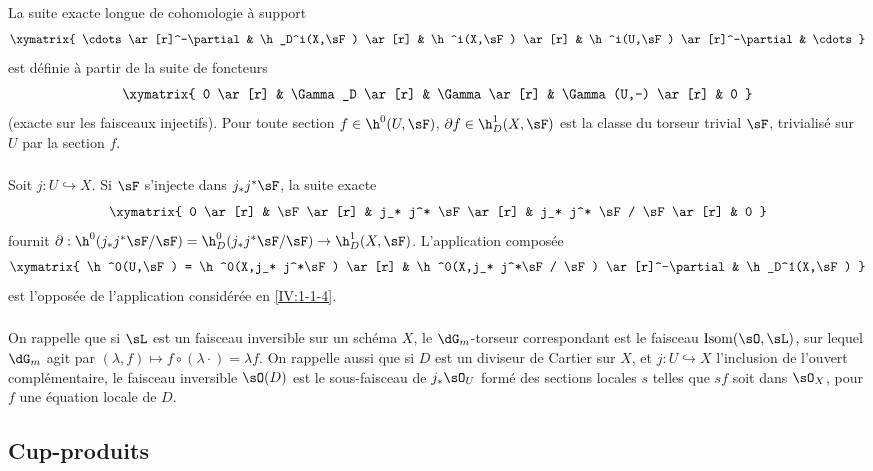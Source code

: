 La suite exacte longue de cohomologie à support
\[\xymatrix{
  \cdots \ar[r]^-\partial 
    & \h_D^i(X,\sF) \ar[r] 
    & \h^i(X,\sF) \ar[r]
    & \h^i(U,\sF) \ar[r]^-\partial 
    & \cdots
}\]
est définie à partir de la suite de foncteurs 
\[\xymatrix{
  0 \ar[r] 
    & \Gamma_D \ar[r] 
    & \Gamma \ar[r] 
    & \Gamma(U,-) \ar[r] 
    & 0
}\]
(exacte sur les faisceaux injectifs). Pour toute section $f\in \h^0(U,\sF)$, 
$\partial f\in \h_D^1(X,\sF)$ est la classe du torseur trivial $\sF$, 
trivialisé sur $U$ par la section $f$. 





\subsubsection{}\label{IV:1-1-5}

\marginpar{!}Soit $j:U\hookrightarrow X$. Si $\sF$ s'injecte dans $j_* j^* \sF$, la suite 
exacte 
\[\xymatrix{
  0 \ar[r] 
  & \sF \ar[r]
  & j_* j^* \sF \ar[r]
  & j_* j^* \sF / \sF \ar[r]
  & 0
}\]
fournit 
$\partial:\h^0(j_* j^*\sF/\sF) = \h_D^0(j_* j^* \sF/\sF) \to \h_D^1(X,\sF)$. 
L'application composée 
\[\xymatrix{
  \h^0(U,\sF) = \h^0(X,j_* j^*\sF) \ar[r] 
    & \h^0(X,j_* j^*\sF / \sF) \ar[r]^-\partial 
    & \h_D^1(X,\sF)
}\]
est l'opposée de l'application considérée en \ref{IV:1-1-4}. 





\subsubsection{}\label{IV:1-1-6}

On rappelle que si $\sL$ est un faisceau inversible sur un schéma $X$, le 
$\dG_m$-torseur correspondant est le faisceau $\operatorname{Isom}(\sO,\sL)$, 
sur lequel $\dG_m$ agit par 
$(\lambda,f)\mapsto f\circ (\lambda\cdot) = \lambda f$. On rappelle aussi que 
si $D$ est un diviseur de Cartier sur $X$, et $j:U\hookrightarrow X$ 
l'inclusion de l'ouvert complémentaire, le faisceau inversible $\sO(D)$ est le 
sous-faisceau de $j_*\sO_U$ formé des sections locales $s$ telles que $s f$ 
soit dans $\sO_X$, pour $f$ une équation locale de $D$.










\subsection{Cup-produits}\label{IV:1-2}

